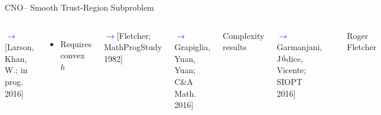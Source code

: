 \documentclass[handout,aspectratio=54]{beamer}
\numberwithin{theorem}{section}
\begin{document}
\begin{frame}{CNO– Smooth Trust-Region Subproblem}
\begin{columns}
\begin{itemize}
\flushright\scriptsize\textcolor{blue}{$\rightarrow$}\textcolor[RGB]{128,0,128}{[Larson, Khan, W.; in prog. 2016]}
\normalsize
\end{itemize}

\begin{itemize}
\item Requires convex $h$
\end{itemize}

\flushright\scriptsize
\textcolor{blue}{$\rightarrow$}\textcolor[RGB]{128,0,128}{[Fletcher; MathProgStudy 1982]}

\textcolor{blue}{$\rightarrow$}\textcolor[RGB]{128,0,128}{Grapiglia, Yuan, Yuan; C\&A Math. 2016]}

Complexity results

\textcolor{blue}{$\rightarrow$}\textcolor[RGB]{128,0,128}{Garmanjani, J$\acute{\textup{u}}$dice, Vicente; SIOPT 2016]}

\footnotesize

\includegraphics[width=\textwidth]{fig/54.jpg}
\begin{center}
Roger Fletcher
\end{center}
\end{columns}
\end{frame}
\end{document}
